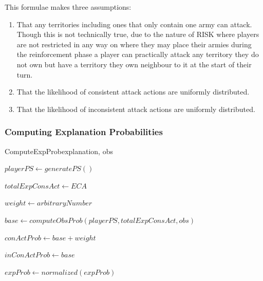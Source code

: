 \documentclass[parskip]{cs4rep}
\begin{document}
This formulae makes three assumptions:

\begin{enumerate}
\item
That any territories including ones that only contain one army can attack. Though this is not technically true, due to the nature of RISK where players are not restricted in any way on where they may place their armies during the reinforcement phase a player can practically attack any territory they do not own but have a territory they own neighbour to it at the start of their turn.
\item
That the likelihood of consistent attack actions are uniformly distributed.
\item
That the likelihood of inconsistent attack actions are uniformly distributed.
\end{enumerate}

\subsubsection{Computing Explanation Probabilities}

\begin{pseudocode}[ruled]{ComputeExpProb}{explanation, obs}
\begin{algorithm}[H]


$playerPS \gets generatePS()$

$totalExpConsAct \gets ECA$

$weight \gets arbitraryNumber$ \newline

$base \gets computeObsProb(playerPS, totalExpConsAct, obs)$ 

$conActProb \gets base + weight$

$inConActProb \gets base$ \newline


$expProb \gets normalized(expProb)$

\end{algorithm}
\end{pseudocode}
\end{document}
